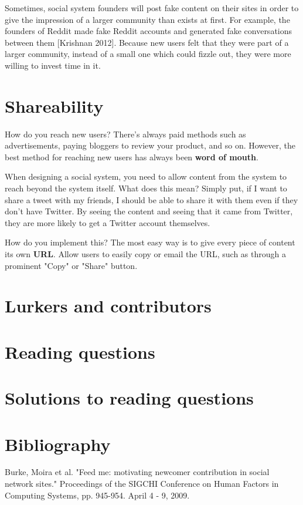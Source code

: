 \documentclass[class=book, crop=false]{standalone}
\providecommand{\keyterm}[1]{\textbf{#1}\marginnote{\scriptsize \textbf{#1}}}
\begin{document}
Sometimes, social system founders will post fake content on their sites in order to give the impression of a larger community than exists at first. For example, the founders of Reddit made fake Reddit accounts and generated fake conversations between them [Krishnan 2012]. Because new users felt that they were part of a larger community, instead of a small one which could fizzle out, they were more willing to invest time in it.

\section{Shareability}
How do you reach new users? There's always paid methods such as advertisements, paying bloggers to review your product, and so on. However, the best method for reaching new users has always been \keyterm{word of mouth}.

When designing a social system, you need to allow content from the system to reach beyond the system itself. What does this mean? Simply put, if I want to share a tweet with my friends, I should be able to share it with them even if they don't have Twitter. By seeing the content and seeing that it came from Twitter, they are more likely to get a Twitter account themselves.

How do you implement this? The most easy way is to give every piece of content its own \keyterm{URL}. Allow users to easily copy or email the URL, such as through a prominent "Copy" or "Share" button.

\section{Lurkers and contributors}

\section{Reading questions}

\section{Solutions to reading questions}

\section{Bibliography}

Burke, Moira et al. "Feed me: motivating newcomer contribution in social network sites." Proceedings of the SIGCHI Conference on Human Factors in Computing Systems, pp. 945-954. April 4 - 9, 2009.
\end{document}
